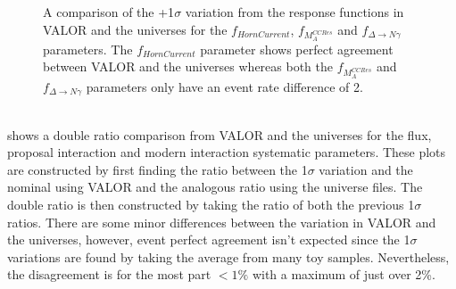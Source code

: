 \begin{figure}[h!]
  \captionsetup{width=0.49\textwidth}
  \parbox[b]{0.49\textwidth}%
  {
   \caption[+1$\sigma$ variation comparison for the $f_{HornCurrent}$, $f_{M_A^{CCRes}}$ and $f_{\Delta \rightarrow N \gamma}$ parameters.]{A comparison of the +1$\sigma$ variation from the response functions in VALOR and the universes for the $f_{HornCurrent}$, $f_{M_A^{CCRes}}$ and $f_{\Delta \rightarrow N \gamma}$ parameters. The $f_{HornCurrent}$ parameter shows perfect agreement between VALOR and the universes whereas both the $f_{M_A^{CCRes}}$ and $f_{\Delta \rightarrow N \gamma}$ parameters only have an event rate difference of 2. \\\phantom{.}\\
   \label{fig:+1sigma_variations}}
   }
\end{figure}

 shows a double ratio comparison from VALOR and the universes for the flux, proposal interaction and modern interaction systematic parameters. These plots are constructed by first finding the ratio between the 1$\sigma$ variation and the nominal using VALOR and the analogous ratio using the universe files. The double ratio is then constructed by taking the ratio of both the previous 1$\sigma$ ratios. There are some minor differences between the variation in VALOR and the universes, however, event perfect agreement isn't expected since the 1$\sigma$ variations are found by taking the average from many toy samples. Nevertheless, the disagreement is for the most part $< 1\%$ with a maximum of just over 2\%. 



